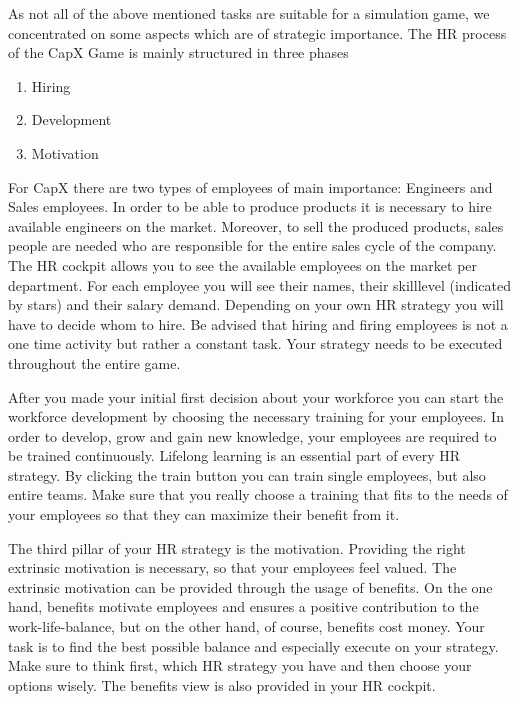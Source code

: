 As not all of the above mentioned tasks are suitable for a simulation game, we concentrated on some aspects which are of strategic importance.
The HR process of the CapX Game is mainly structured in three phases
\begin{enumerate}
    \item Hiring
    \item Development
    \item Motivation
\end{enumerate}
For CapX there are two types of employees of main importance: Engineers and Sales employees. In order to be able to produce products it is necessary to hire available engineers on the market. Moreover, to sell the produced products, sales people are needed who are responsible for the entire sales cycle of the company.\\
The HR cockpit allows you to see the available employees on the market per department. For each employee you will see their names, their skilllevel (indicated by stars) and their salary demand. Depending on your own HR strategy you will have to decide whom to hire. Be advised that hiring and firing employees is not a one time activity but rather a constant task. Your strategy needs to be executed throughout the entire game. 

After you made your initial first decision about your workforce you can start the workforce development by choosing the necessary training for your employees. In order to develop, grow and gain new knowledge, your employees are required to be trained continuously. Lifelong learning is an essential part of every HR strategy. By clicking the train button you can train single employees, but also entire teams. Make sure that you really choose a training that fits to the needs of your employees so that they can maximize their benefit from it. 

The third pillar of your HR strategy is the motivation. Providing the right extrinsic motivation is necessary, so that your employees feel valued. The extrinsic motivation can be provided through the usage of benefits. On the one hand, benefits motivate employees and ensures a positive contribution to the work-life-balance, but on the other hand, of course, benefits cost money. Your task is to find the best possible balance and especially execute on your strategy. Make sure to think first, which HR strategy you have and then choose your options wisely. The benefits view is also provided in your HR cockpit.